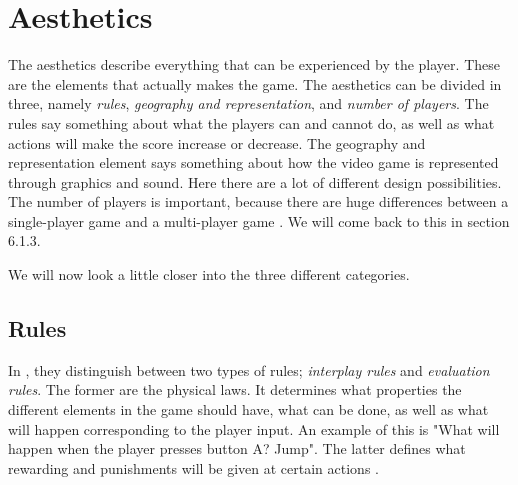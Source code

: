 \section{Aesthetics}
The aesthetics describe everything that can be experienced by the player. These are the elements that actually makes the game. The aesthetics can be divided in three, namely \emph{rules}, \emph{geography and representation}, and \emph{number of players}. The rules say something about what the players can and cannot do, as well as what actions will make the score increase or decrease. The geography and representation element says something about how the video game is represented through graphics and sound. Here there are a lot of different design possibilities. The number of players is important, because there are huge differences between a single-player game and a multi-player game \cite{understandingvg}. We will come back to this in section 6.1.3. 

We will now look a little closer into the three different categories.

\subsection{Rules}
In \cite{understandingvg}, they distinguish between two types of rules; \emph{interplay rules} and \emph{evaluation rules}. The former are the physical laws. It determines what properties the different elements in the game should have, what can be done, as well as what will happen corresponding to the player input. An example of this is "What will happen when the player presses button A? Jump". The latter defines what rewarding and punishments will be given at certain actions \cite{understandingvg}. 

